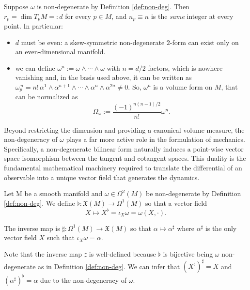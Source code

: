 \begin{corollary}\label{cor:omega-prop}
	Suppose $\omega$ is non-degenerate by Definition \ref{def:non-deg}. Then $r_p = \dim T_pM =: d$ for every $p \in M$, and $n_p \equiv n$ is the \emph{same} integer at every point. In particular:
	\begin{itemize}
		\item $d$ must be even: a skew-symmetric non-degenerate $2$-form can exist only on an even-dimensional manifold.
		\item we can define $\omega^n := \omega \wedge \cdots \wedge \omega$ with $n=d/2$ factors, which is nowhere-vanishing and, in the basis used above, it can be written as $\omega_p^{\,n} = n!\,\alpha^1\wedge\alpha^{n+1}\wedge\cdots\wedge\alpha^n\wedge\alpha^{2n} \neq 0$. So, $\omega^n$ is a volume form on $M$, that can be normalized as
		\[
		\Omega_\omega := \frac{(-1)^{n(n-1)/2}}{n!} \omega^n.
		\]
	\end{itemize}
\end{corollary}

Beyond restricting the dimension and providing a canonical volume measure, the non-degeneracy of $\omega$ plays a far more active role in the formulation of mechanics. Specifically, a non-degenerate bilinear form naturally induces a point-wise vector space isomorphism between the tangent and cotangent spaces. This duality is the fundamental mathematical machinery required to translate the differential of an observable into a unique vector field that generates the dynamics.

\begin{definition}\label{def:musical}
	Let M be a smooth manifold and $\omega \in \Omega^2(M)$ be non-degenerate by Definition \ref{def:non-deg}. We define $\flat :\mathfrak{X}(M) \to \Omega^1(M)$ so that a vector field $$X \mapsto X^\flat = \iota_X\omega = \omega(X, \cdot).$$ 
	
	The inverse map is $\sharp: \Omega^1(M) \to \mathfrak{X}(M)$ so that $\alpha \mapsto \alpha^\sharp$ where $\alpha^\sharp$ is the only vector field $X$ such that $\iota_X \omega= \alpha$.
\end{definition}

\begin{remark}
	Note that the inverse map $\sharp$ is well-defined because $\flat$ is bijective being $\omega$ non-degenerate as in Definition \ref{def:non-deg}. We can infer that $(X^\flat)^\sharp = X$ and $(\alpha^\sharp)^\flat = \alpha$ due to the non-degeneracy of $\omega$.
\end{remark}


